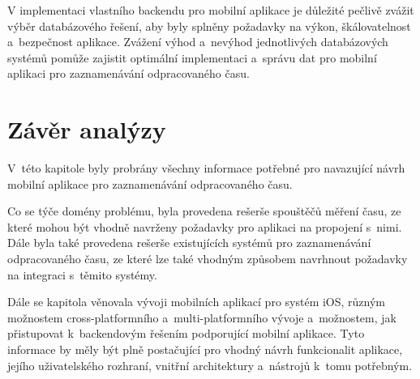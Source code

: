 V implementaci vlastního backendu pro mobilní aplikace je důležité pečlivě zvážit výběr databázového řešení, aby byly splněny požadavky na výkon, škálovatelnost a~bezpečnost aplikace. Zvážení výhod a~nevýhod jednotlivých databázových systémů pomůže zajistit optimální implementaci a~správu dat pro mobilní aplikaci pro zaznamenávání odpracovaného času.

\section{Závěr analýzy}

V~této kapitole byly probrány všechny informace potřebné pro navazující návrh mobilní aplikace pro zaznamenávání odpracovaného času. 

Co se týče domény problému, byla provedena rešerše spouštěčů měření času, ze které mohou být vhodně navrženy požadavky pro aplikaci na propojení s~nimi. Dále byla také provedena rešerše existujících systémů pro zaznamenávání odpracovaného času, ze které lze také vhodným způsobem navrhnout požadavky na integraci s~těmito systémy.

Dále se kapitola věnovala vývoji mobilních aplikací pro systém iOS, různým možnostem cross-platformního a~multi-platformního vývoje a~možnostem, jak přistupovat k~backendovým řešením podporující mobilní aplikace. Tyto informace by měly být plně postačující pro vhodný návrh funkcionalit aplikace, jejího uživatelského rozhraní, vnitřní architektury a~nástrojů k~tomu potřebným.











































